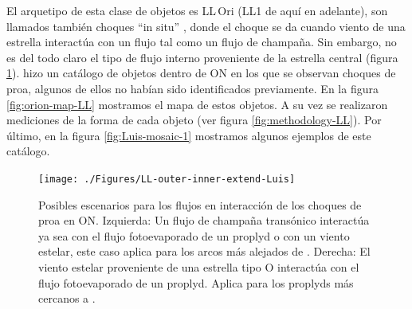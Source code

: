 El arquetipo de esta clase de objetos es LL\,Ori (LL1 de aquí en adelante), son llamados también choques ``in situ'' \citep{Kobulnicky:2016}, donde el choque se da cuando viento de una estrella interactúa con un flujo tal como un flujo de champaña. Sin embargo, no es del todo claro el tipo de flujo interno proveniente de la estrella central (figura \ref{fig:LL-scheme}). \citet{Gutierrez-Soto:2015a} hizo un catálogo de objetos dentro de ON en los que se observan choques de proa, algunos de ellos no habían sido identificados previamente. En la figura \ref{fig:orion-map-LL} mostramos el mapa de estos objetos. A su vez se realizaron mediciones de la forma de cada objeto (ver figura \ref{fig:methodology-LL}). Por último, en la figura \ref{fig:Luis-mosaic-1} mostramos algunos ejemplos de este catálogo.

\begin{figure}
  \centering
  \texttt{[image: ./Figures/LL-outer-inner-extend-Luis]}
  \caption[Posibles escenarios para los flujos en interacción de los choques de proa en ON]{Posibles escenarios para los flujos en interacción de los choques de proa en ON. Izquierda: Un flujo de champaña transónico interactúa ya sea con el flujo fotoevaporado de un proplyd o con un viento estelar, este caso aplica para los arcos más alejados de \thC{}. Derecha: El viento estelar proveniente de una estrella tipo O interactúa con el flujo fotoevaporado de un proplyd. Aplica para los proplyds más cercanos a \thC{}.}
  \label{fig:LL-scheme}
\end{figure}

